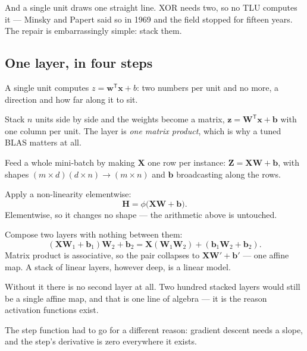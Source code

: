 \documentclass[11pt,a4paper]{article}
\begin{document}
And a single unit draws one straight line. XOR needs two, so no TLU computes
it --- Minsky and Papert said so in 1969 and the field stopped for fifteen
years. The repair is embarrassingly simple: stack them.

\subsection{One layer, in four steps}

\begin{derivbox}[title={From one unit to a mini-batch}]
A single unit computes $z = \mathbf{w}^{\mathsf T}\mathbf{x} + b$: two numbers
per unit and no more, a direction and how far along it to sit.

Stack $n$ units side by side and the weights become a matrix,
$\mathbf{z} = \mathbf{W}^{\mathsf T}\mathbf{x} + \mathbf{b}$ with one column
per unit. The layer is \emph{one matrix product}, which is why a tuned BLAS
matters at all.

Feed a whole mini-batch by making $\mathbf{X}$ one row per instance:
$\mathbf{Z} = \mathbf{X}\mathbf{W} + \mathbf{b}$, with shapes
$(m\times d)(d\times n) \to (m\times n)$ and $\mathbf{b}$ broadcasting along
the rows.

Apply a non-linearity elementwise:
\[ \mathbf{H} = \phi\bigl(\mathbf{X}\mathbf{W} + \mathbf{b}\bigr). \]
Elementwise, so it changes no shape --- the arithmetic above is untouched.
\end{derivbox}

\begin{derivbox}[title={Now remove $\phi$, and watch the stack collapse}]
Compose two layers with nothing between them:
\[ (\mathbf{X}\mathbf{W}_1 + \mathbf{b}_1)\mathbf{W}_2 + \mathbf{b}_2
   = \mathbf{X}(\mathbf{W}_1\mathbf{W}_2)
   + (\mathbf{b}_1\mathbf{W}_2 + \mathbf{b}_2). \]
Matrix product is associative, so the pair collapses to
$\mathbf{X}\mathbf{W}' + \mathbf{b}'$ --- one affine map. A stack of linear
layers, however deep, is a linear model.
\end{derivbox}

\begin{keybox}[title={So $\phi$ is not a refinement}]
Without it there is no second layer at all. Two hundred stacked layers would
still be a single affine map, and that is one line of algebra --- it is the
reason activation functions exist.
\end{keybox}

The step function had to go for a different reason: gradient descent needs a
slope, and the step's derivative is zero everywhere it exists.
\end{document}

